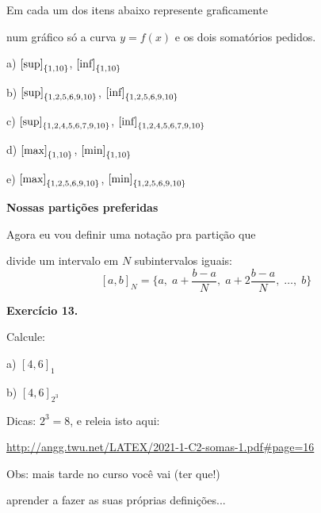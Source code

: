 \documentclass[oneside,12pt]{article}
\begin{document}
\bsk

Em cada um dos itens abaixo represente graficamente

num gráfico só a curva $y=f(x)$ e os dois somatórios pedidos.

a) $\text{[sup]}_{\{1,10\}}$, 
   $\text{[inf]}_{\{1,10\}}$

\ssk

b) $\text{[sup]}_{\{1,2,5,6,9,10\}}$, 
   $\text{[inf]}_{\{1,2,5,6,9,10\}}$

\ssk

c) $\text{[sup]}_{\{1,2,4,5,6,7,9,10\}}$, 
   $\text{[inf]}_{\{1,2,4,5,6,7,9,10\}}$

\bsk

d) $\text{[max]}_{\{1,10\}}$, 
   $\text{[min]}_{\{1,10\}}$

\ssk

e) $\text{[max]}_{\{1,2,5,6,9,10\}}$, 
   $\text{[min]}_{\{1,2,5,6,9,10\}}$



\newpage


{\bf Nossas partições preferidas}

Agora eu vou definir uma notação pra partição que

divide um intervalo em $N$ subintervalos iguais:
%
\def\baN{\frac{b-a}{N}}
%
$$
  \textstyle
  [a,b]_N = \{a, \; a+\baN, \; a+2\baN, \; \ldots, \; b\}
$$

\msk

{\bf Exercício 13.}

Calcule:

a) $[4,6]_1$

b) $[4,6]_{2^3}$

\msk

Dicas: $2^3=8$, e releia isto aqui:

\ssk

{\footnotesize

\url{http://angg.twu.net/LATEX/2021-1-C2-somas-1.pdf\#page=16}

}

\bsk


Obs: mais tarde no curso você vai (ter que!)

aprender a fazer as suas próprias definições...

\newpage
\end{document}
